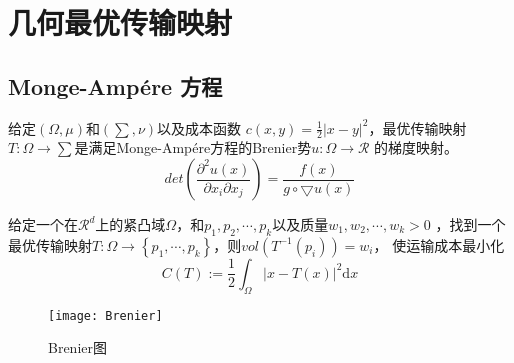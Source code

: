 \section{几何最优传输映射}

\subsection{Monge-Amp\'ere 方程}

\begin{problem}[Brenier] \label{pro: Brenier}
    给定$(\Omega, \mu)$和$(\sum, \nu)$以及成本函数 $c(x,y)=\frac{1}{2}\left | x-y \right |^2 $，最优传输映射$T: \Omega \to \sum$是满足Monge-Amp\'ere方程的Brenier势$u:\Omega \to \mathcal{R}$
    的梯度映射。
    \begin{equation}
        \boxed{ det \left ( \frac{\partial ^2 u(x)}{\partial x_i \partial x_j}  \right ) = \frac{f(x)}{g \circ \bigtriangledown u(x)}  }
        \label{equ:Monge-Amp\'ere}
    \end{equation}
\end{problem}

\begin{problem}\label{pro: Semi-discrete OT}
    给定一个在$\mathcal{R}^d$上的紧凸域$\Omega$，和$p_1,p_2,\cdots , p_k$以及质量$w_1,w_2, \cdots , w_k >0$ ，找到一个最优传输映射$T:\Omega \to \left \{ p_1,\cdots ,p_k \right \}$，则$vol(T^{-1}(p_i))=w_i$，
    使运输成本最小化
    \begin{equation}
        C(T):=\frac{1}{2} \int _{\Omega} \left | x-T(x) \right |^2 \mathrm{d}x
        \label{equ:cost} 
    \end{equation}
\end{problem}

\begin{figure}
    [h]
	\centering
	\texttt{[image: Brenier]}
	\caption{ Brenier图}
	\label{fig: Brenier}
\end{figure}


